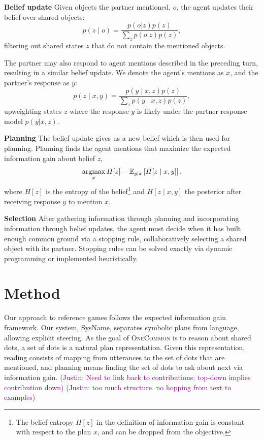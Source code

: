 \documentclass[11pt]{article}
\newcommand{\system}{SysName}
\newcommand{\justin}[1]{{{\textcolor{purple}{(Justin: #1)}}}}
\newcommand{\daniel}[1]{{{\textcolor{brown}{(Daniel: #1)}}}}
\begin{document}
\textbf{Belief update} 
Given objects the partner mentioned, $o$, the agent updates their belief over shared objects:
\begin{equation}
\label{eqn:update-mention}
p(z \mid o)
= \frac{p(o | z)p(z)}{\sum_z p(o | z)p(z)},
\end{equation}
filtering out shared states $z$ that do not contain the mentioned objects.

The partner may also respond to agent mentions described in the preceding turn, resulting in a similar belief update.
We denote the agent's mentions as $x$, and the partner's response as $y$:
\begin{equation}
\label{eqn:update}
p(z \mid x, y)
= \frac{p(y \mid x,z)p(z)}{\sum_z p(y\mid x,z)p(z)},    
\end{equation}
upweighting states $z$ where the response $y$ is likely under the partner response model $p(y|x,z)$.

\textbf{Planning} The belief update gives us a new belief which is then used for planning.
Planning finds the agent mentions that maximize the expected information gain \citep{lindley} about belief $z$,
\begin{equation}
\label{eqn:eig}
\operatorname*{argmax}_x H[z] - \mathbb{E}_{y \mid x}\left[H[z \mid x,y]\right],
\end{equation}
where $H[z]$ is the entropy of the belief\footnote{The belief entropy $H[z]$ in the definition of information gain is constant with respect to
the plan $x$, and can be dropped from the objective.}
 and $H[z\mid x,y]$ the posterior after receiving response $y$ to mention $x$.

\textbf{Selection} After gathering information through planning and
incorporating information through belief updates,
the agent must decide when it has built enough common ground via a stopping rule,
collaboratively selecting a shared object with its partner.
Stopping rules can be solved exactly via dynamic programming or implemented heuristically.

\section{Method}
Our approach to reference games follows the expected information gain framework.
Our system, \system{}, separates symbolic plans from language,
allowing explicit steering.
As the goal of \textsc{OneCommon} is to reason about shared dots,
a set of dots is a natural plan representation.
Given this representation, reading consists of mapping from utterances to the set of dots that are mentioned, and planning means finding the set of dots to ask about next via information gain.
\justin{Need to link back to contributions: top-down implies contribution down}
\justin{too much structure. no hopping from text to examples}
\end{document}
